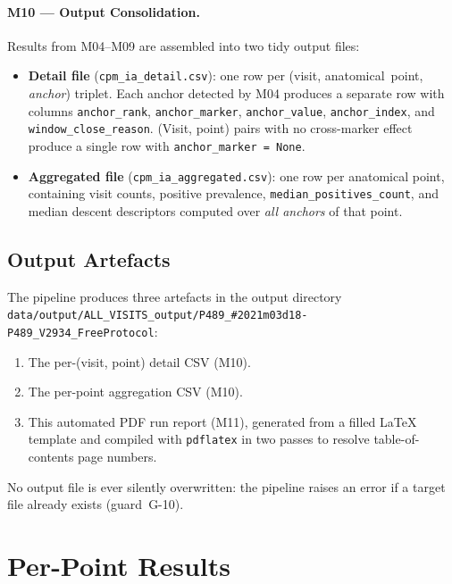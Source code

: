 \documentclass[a4paper,11pt]{article}
\begin{document}
\paragraph{M10 --- Output Consolidation.}
Results from M04--M09 are assembled into two tidy output files:
\begin{itemize}
  \item \textbf{Detail file} (\texttt{cpm\_ia\_detail.csv}): one row per
        (visit, anatomical~point, \emph{anchor}) triplet. Each anchor detected by M04
        produces a separate row with columns \texttt{anchor\_rank},
        \texttt{anchor\_marker}, \texttt{anchor\_value}, \texttt{anchor\_index},
        and \texttt{window\_close\_reason}.
        (Visit, point) pairs with no cross-marker effect produce a single row with
        \texttt{anchor\_marker = None}.
  \item \textbf{Aggregated file} (\texttt{cpm\_ia\_aggregated.csv}): one row per
        anatomical point, containing visit counts, positive prevalence,
        \texttt{median\_positives\_count}, and median descent descriptors computed over
        \emph{all anchors} of that point.
\end{itemize}

\subsection{Output Artefacts}

The pipeline produces three artefacts in the output directory \texttt{data/output/ALL\_VISITS\_output/P489\_\#2021m03d18-P489\_V2934\_FreeProtocol}:
\begin{enumerate}
  \item The per-(visit, point) detail CSV (M10).
  \item The per-point aggregation CSV (M10).
  \item This automated PDF run report (M11), generated from a filled \LaTeX{} template
        and compiled with \texttt{pdflatex} in two passes to resolve table-of-contents
        page numbers.
\end{enumerate}
No output file is ever silently overwritten: the pipeline raises an error if a target
file already exists (guard~G-10).

\section{Per-Point Results}
\end{document}
